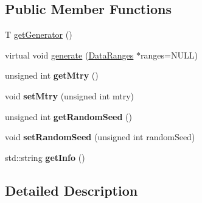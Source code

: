 \subsection*{Public Member Functions}
\begin{DoxyCompactItemize}
\item 
T \hyperlink{classffactory_1_1_random_features_split_candidate_generator_ac7341a0ec1174465c4fd95339ba3010d}{get\-Generator} ()
\item 
virtual void \hyperlink{classffactory_1_1_random_features_split_candidate_generator_a393347e40e556e7b15953601e23c5bbd}{generate} (\hyperlink{classffactory_1_1_data_ranges}{Data\-Ranges} $\ast$ranges=N\-U\-L\-L)
\item 
\hypertarget{classffactory_1_1_random_features_split_candidate_generator_af34ed58e1f3e417d81a5b964775498f8}{unsigned int {\bfseries get\-Mtry} ()}\label{classffactory_1_1_random_features_split_candidate_generator_af34ed58e1f3e417d81a5b964775498f8}

\item 
\hypertarget{classffactory_1_1_random_features_split_candidate_generator_a762ec2f46ab649b77633d4dd4469e57b}{void {\bfseries set\-Mtry} (unsigned int mtry)}\label{classffactory_1_1_random_features_split_candidate_generator_a762ec2f46ab649b77633d4dd4469e57b}

\item 
\hypertarget{classffactory_1_1_random_features_split_candidate_generator_a27d5568488bf2a6c8c54ab138eacd0d7}{unsigned int {\bfseries get\-Random\-Seed} ()}\label{classffactory_1_1_random_features_split_candidate_generator_a27d5568488bf2a6c8c54ab138eacd0d7}

\item 
\hypertarget{classffactory_1_1_random_features_split_candidate_generator_a7e5986eddd1e2efd1e946848a64384c8}{void {\bfseries set\-Random\-Seed} (unsigned int random\-Seed)}\label{classffactory_1_1_random_features_split_candidate_generator_a7e5986eddd1e2efd1e946848a64384c8}

\item 
\hypertarget{classffactory_1_1_random_features_split_candidate_generator_afdcca6dbdc53c3528dc0dc8948f81781}{std\-::string {\bfseries get\-Info} ()}\label{classffactory_1_1_random_features_split_candidate_generator_afdcca6dbdc53c3528dc0dc8948f81781}

\end{DoxyCompactItemize}


\subsection{Detailed Description}
